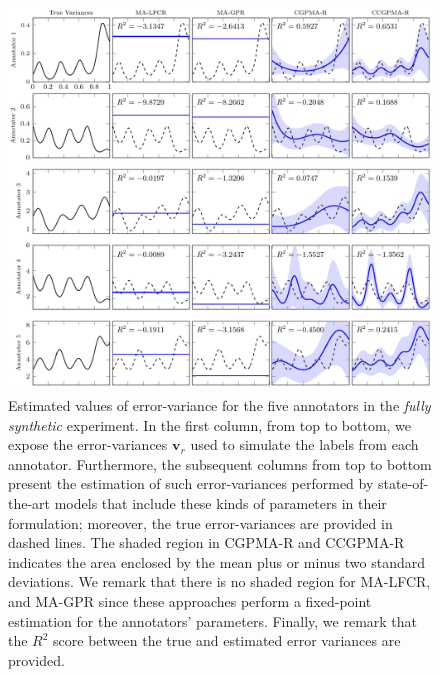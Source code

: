 \documentclass[journal]{IEEEtran}
\newcommand{\boldv}{\mathbf{v}}
\begin{document}
\begin{figure}[!tb]
	\centering
	\includegraphics[width = \textwidth]{Figures/VarEXp.pdf}
	\caption{Estimated values of error-variance for the five annotators in the \textit{fully synthetic} experiment. In the first column, from top to bottom, we expose the error-variances $\boldv_r$ used to simulate the labels from each annotator. Furthermore, the subsequent columns from top to bottom present the estimation of such error-variances performed by state-of-the-art models that include these kinds of parameters in their formulation; moreover, the true error-variances are provided in dashed lines. The shaded region in CGPMA-R and CCGPMA-R indicates the area enclosed by the mean plus or minus two standard deviations. We remark that there is no shaded region for MA-LFCR, and MA-GPR since these approaches perform a fixed-point estimation for the annotators' parameters. Finally, we remark that the $R^2$ score between the true and estimated error variances are provided.}
	\label{fig:ExpReg}
\end{figure}
\end{document}
